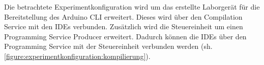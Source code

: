 Die betrachtete Experimentkonfiguration wird um das erstellte Laborgerät für die Bereitstellung des Arduino CLI erweitert. Dieses wird über den Compilation Service mit den IDEs verbunden. Zusätzlich wird die Steuereinheit um einen Programming Service Producer erweitert. Dadurch können die IDEs über den Programming Service mit der Steuereinheit verbunden werden (sh. \autoref{figure:experimentkonfiguration:kompilierung}).